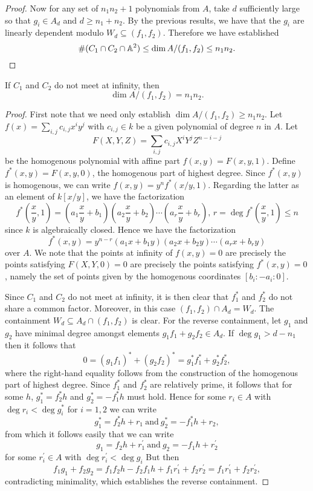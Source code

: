 \documentclass[10pt]{amsart}
\begin{document}
\begin{prop}
\begin{proof}
		Now for any set of $n_1n_2 + 1$ polynomials from $A$, take $d$ sufficiently large so that $g_i \in A_d$ and $d \geq n_ 1 + n_2$.
		By the previous results, we have that the $g_i$ are linearly dependent modulo $W_d \subseteq (f_1, f_2)$.
		Therefore we have established
			$$\#(C_1 \cap C_2 \cap \mathbb{A}^2) \leq \dim A /(f_1,f_2) \leq n_1n_2.$$

	\end{proof}
\end{prop}

\begin{prop}\label{prop2}
	If $C_1$ and $C_2$ do not meet at infinity, then
		$$\dim A /(f_1,f_2) = n_1n_2.$$

	\begin{proof}
		First note that we need only establish $\dim A/(f_1, f_2) \geq n_1n_2$.
		Let $f(x) = \sum_{i,j} c_{i,j}x^iy^j$ with $c_{i,j} \in k$ be a given polynomial of degree $n$ in $A$.
		Let 
			$$F(X,Y,Z) = \sum_{i,j}c_{i,j}X^iY^jZ^{n - i - j}$$
		be the homogenous polynomial with affine part $f(x,y) = F(x,y,1)$.
		Define $f^*(x,y) = F(x,y,0)$, the homogenous part of highest degree.
		Since $f^*(x,y)$ is homogenous, we can write $f(x,y) = y^nf^*(x/y, 1)$.
		Regarding the latter as an element of $k\left[x/y\right]$, we have the factorization 
			$$f^*\left(\frac{x}{y}, 1\right) = \left(a_1\frac{x}{y} + b_1\right)\left(a_2\frac{x}{y} + b_2\right)\cdots\left(a_r\frac{x}{y} + b_r\right),\, r = \deg{f^*\left(\frac{x}{y}, 1\right)} \leq n$$		
		since $k$ is algebraically closed.
		Hence we have the factorization
			$$f^*(x,y) = y^{n-r}(a_1x + b_1y)(a_2x + b_2y)\cdots(a_rx + b_ry)$$
		over $A$.
		We note that the points at infinity of $f(x,y) = 0$ are precisely the points satisfying $F(X,Y,0) = 0$ are precisely the points satisfying $f^*(x,y) = 0$, namely the set of points given by the homogenous coordinates $[b_i : -a_i : 0]$.
		
		Since $C_1$ and $C_2$ do not meet at infinity, it is then clear that $f_1^*$ and $f_2^*$ do not share a common factor.
		Moreover, in this case $(f_1, f_2) \cap A_d = W_d$.
		The containment $W_d \subseteq A_d \cap (f_1, f_2)$ is clear.
		For the reverse containment, let $g_1$ and $g_2$ have minimal degree amongst elements $g_1f_1 + g_2f_2 \in A_d$.
		If $\deg{g_1} > d - n_1$ then it follows that
			$$0 = (g_1f_1)^* + (g_2f_2)^* = g_1^*f_1^* + g_2^*f_2^*,$$
		where the right-hand equality follows from the construction of the homogenous part of highest degree.
		Since $f_1^*$ and $f_2^*$ are relatively prime, it follows that for some $h$, $g_1^* = f_2^*h$ and $g_2^* = -f_1^*h$ must hold.
		Hence for some $r_i \in A$ with $\deg{r_i} < \deg{g_i^*}$ for $i = 1,2$ we can write
		$$g_1^* = f_2^*h + r_1\ \text{and}\ g_2^* = -f_1^*h + r_2,$$
		from which it follows easily that we can write 
			$$g_1 = f_2h + r_1^\prime\ \text{and}\ g_2 = -f_1h + r_2^\prime$$
		for some $r_i^\prime \in A$ with $\deg{r_i^\prime} < \deg{g_i}$
		But then
			$$f_1g_1 + f_2g_2 = f_1f_2h - f_2f_1h + f_1r_1^\prime + f_2r_2^\prime = f_1r_1^\prime + f_2r_2^\prime,$$
		contradicting minimality, which establishes the reverse containment.


\end{proof}
\end{prop}
\end{document}
